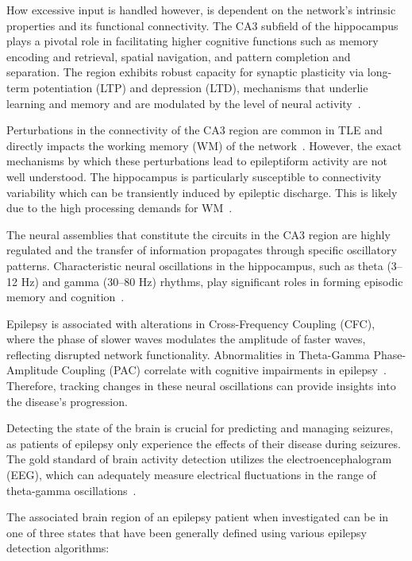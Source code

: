 How excessive input is handled however, is dependent on the network's intrinsic properties and its functional connectivity.
The CA3 subfield of the hippocampus plays a pivotal role in facilitating higher cognitive functions such as memory encoding and retrieval,
spatial navigation, and pattern completion and separation. The region exhibits robust capacity for synaptic plasticity via long-term potentiation
(LTP) and depression (LTD), mechanisms that underlie learning and memory and are modulated by the level of neural activity~\parencite{stokesComplementaryRolesHuman2015}.

Perturbations in the connectivity of the CA3 region are common in TLE and directly impacts the working memory (WM)
of the network~\parencite{arskiOscillatoryBasisWorking2021}. However, the exact mechanisms by which these perturbations lead to epileptiform
activity are not well understood. The hippocampus is particularly susceptible to connectivity variability which can be transiently induced by epileptic discharge.
This is likely due to the high processing demands for WM~\parencite{aldenkampEffectsEpileptiformEEG2004}.

The neural assemblies that constitute the circuits in the CA3 region are highly regulated and the transfer of
information propagates through specific oscillatory patterns.
Characteristic neural oscillations in the hippocampus, such as theta (3--12 Hz)
and gamma (30--80 Hz) rhythms, play significant roles in forming episodic memory and cognition~\parencite{nyhusFunctionalRoleGamma2010}.

Epilepsy is associated with alterations in Cross-Frequency Coupling (CFC), where
the phase of slower waves modulates the amplitude of faster waves, reflecting
disrupted network functionality. Abnormalities in Theta-Gamma Phase-Amplitude
Coupling (PAC) correlate with cognitive impairments in epilepsy~\parencite{liuEpileptogenicZoneLocation2021}.
Therefore, tracking changes in these neural oscillations can provide insights into the disease's progression.

Detecting the state of the brain is crucial for predicting and managing seizures, as patients of epilepsy
only experience the effects of their disease during seizures.
The gold standard of brain activity detection utilizes the electroencephalogram (EEG),
which can adequately measure electrical fluctuations in the range of theta-gamma oscillations~\parencite{noachtarRoleEEGEpilepsy2009}.

The associated brain region of an epilepsy patient when investigated can be in one of three states that have been generally defined using
various epilepsy detection algorithms:

